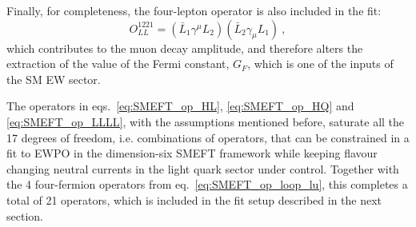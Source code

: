 Finally, for completeness, the four-lepton operator is also included in the fit:
\begin{equation}
	\label{eq:SMEFT_op_LLLL}
	O^{1221}_{LL}=(\bar{L}_1 \gamma^\mu L_2) (\bar{L}_2 \gamma_\mu L_1) \ ,
\end{equation}
which contributes to the muon decay amplitude, and therefore alters the extraction of the value of the Fermi constant, $G_F$, which is one of the inputs of the SM EW sector.

The operators in eqs.~\eqref{eq:SMEFT_op_HL}, \eqref{eq:SMEFT_op_HQ} and \eqref{eq:SMEFT_op_LLLL}, with the assumptions mentioned before, saturate all the 17 degrees of freedom, i.e. combinations of operators, that can be constrained in a fit to EWPO in the dimension-six SMEFT framework while keeping flavour changing neutral currents in the light quark sector under control. Together with the 4 four-fermion operators from eq.~\eqref{eq:SMEFT_op_loop_lu}, this completes a total of 21 operators, which is included in the fit setup described in the next section. 
